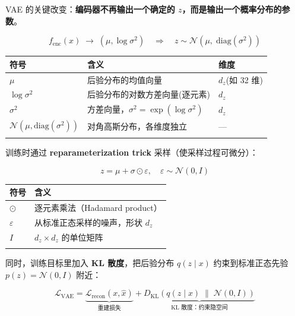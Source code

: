 \documentclass[
  chinese,
]{ctexart}
\begin{document}
VAE 的关键改变：\textbf{编码器不再输出一个确定的
\(z\)，而是输出一个概率分布的参数}。

\[
f_{\text{enc}}(x) \;\to\; (\mu, \log\sigma^2) \quad\Longrightarrow\quad z \sim \mathcal{N}(\mu, \;\text{diag}(\sigma^2))
\]

\begin{center}
\begin{tabular}{@{}>{\raggedright\arraybackslash}p{} >{\raggedright\arraybackslash}p{} >{\raggedright\arraybackslash}p{}@{}}
\toprule\noalign{}
符号 & 含义 & 维度 \\
\midrule\noalign{}
\(\mu\) & 后验分布的均值向量 & \(d_z\)(如 32 维) \\
\(\log\sigma^2\) & 后验分布的对数方差向量(逐元素) & \(d_z\) \\
\(\sigma^2\) & 方差向量，\(\sigma^2 = \exp(\log\sigma^2)\) & \(d_z\) \\
\(\mathcal{N}(\mu, \text{diag}(\sigma^2))\) & 对角高斯分布，各维度独立 & --- \\
\bottomrule\noalign{}
\end{tabular}
\end{center}

训练时通过 \textbf{reparameterization trick} 采样（使采样过程可微分）：

\[
z = \mu + \sigma \odot \varepsilon, \quad \varepsilon \sim \mathcal{N}(0, I)
\]

\begin{center}
\begin{tabular}{@{}>{\raggedright\arraybackslash}p{} >{\raggedright\arraybackslash}p{}@{}}
\toprule\noalign{}
符号 & 含义 \\
\midrule\noalign{}
\(\odot\) & 逐元素乘法（Hadamard product） \\
\(\varepsilon\) & 从标准正态采样的噪声，形状 \(d_z\) \\
\(I\) & \(d_z \times d_z\) 的单位矩阵 \\
\bottomrule\noalign{}
\end{tabular}
\end{center}

同时，训练目标里加入 \textbf{KL 散度}，把后验分布 \(q(z \mid x)\)
约束到标准正态先验 \(p(z) = \mathcal{N}(0, I)\) 附近：

\[
\mathcal{L}_{\text{VAE}} = \underbrace{\mathcal{L}_{\text{recon}}(x, \hat{x})}_{\text{重建损失}} + \underbrace{D_{\text{KL}}\!\left(q(z \mid x) \;\|\; \mathcal{N}(0, I)\right)}_{\text{KL 散度：约束隐空间}}
\]
\end{document}
